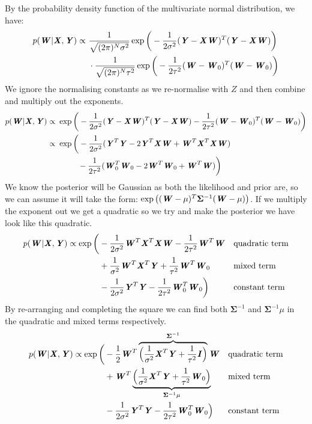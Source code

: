 \documentclass{article}
\newcommand{\mat}[1]{\textbf{\textit{#1}}}
\begin{document}
By the probability density function of the multivariate normal distribution, we have:
\begin{align*}
	p(\mat{W}|\mat{X},\mat{Y}) \propto\ &\frac{1}{\sqrt{(2\pi)^N\sigma^2}}\exp\bigg(-\frac{1}{2\sigma^2}(\mat{Y}-\mat{X}\mat{W})^T(\mat{Y}-\mat{X}\mat{W})\bigg) \\
	&\cdot \frac{1}{\sqrt{(2\pi)^N\tau^2}}\exp\bigg(-\frac{1}{2\tau^2}(\mat{W}-\mat{W}_0)^T(\mat{W}-\mat{W}_0)\bigg) \\
\end{align*}
We ignore the normalising constants as we re-normalise with $Z$ and then combine and multiply out the exponents.
\begin{align*}
	p(\mat{W}|\mat{X},\mat{Y}) \propto\ &\exp\bigg(-\frac{1}{2\sigma^2}(\mat{Y}-\mat{X}\mat{W})^T(\mat{Y}-\mat{X}\mat{W})-\frac{1}{2\tau^2}(\mat{W}-\mat{W}_0)^T(\mat{W}-\mat{W}_0)\bigg) \\
	\propto\ &\exp\bigg(-\frac{1}{2\sigma^2}(\mat{Y}^T\mat{Y}-2\mat{Y}^T\mat{X}\mat{W}+\mat{W}^T\mat{X}^T\mat{X}\mat{W}) \\
	&\hspace{2.5em}-\frac{1}{2\tau^2}(\mat{W}_0^T\mat{W}_0-2\mat{W}^T\mat{W}_0+\mat{W}^T\mat{W})\bigg)
\end{align*}
We know the posterior will be Gaussian as both the likelihood and prior are, so we can assume it will take the form: $\exp\big((\mat{W}-\mu)^T\mathbf{\Sigma}^{-1}(\mat{W}-\mu)\big)$. If we multiply the exponent out we get a quadratic so we try and make the posterior we have look like this quadratic.
\begin{align*}
	p(\mat{W}|\mat{X},\mat{Y}) \propto \exp\bigg(&-\frac{1}{2\sigma^2}\mat{W}^T\mat{X}^T\mat{X}\mat{W}-\frac{1}{2\tau^2}\mat{W}^T\mat{W}	&&\mbox{quadratic term}\\
	&+\frac{1}{\sigma^2}\mat{W}^T\mat{X}^T\mat{Y}+\frac{1}{\tau^2}\mat{W}^T\mat{W}_0							&&\mbox{mixed term}\\
	&-\frac{1}{2\sigma^2}\mat{Y}^T\mat{Y}-\frac{1}{2\tau^2}\mat{W}_0^T\mat{W}_0\bigg)							&&\mbox{constant term}\\
\end{align*}
By re-arranging and completing the square we can find both $\mathbf{\Sigma}^{-1}$ and $\mathbf{\Sigma}^{-1}\mu$ in the quadratic and mixed terms respectively.
\begin{align*}
	p(\mat{W}|\mat{X},\mat{Y}) \propto \exp\bigg(&-\frac{1}{2}\mat{W}^T\overbrace{\Big(\frac{1}{\sigma^2}\mat{X}^T\mat{Y}+\frac{1}{\tau^2}\mat{I}\Big)}^{\mathbf{\Sigma}^{-1}}\mat{W}	&&\mbox{quadratic term}\\
	&+\mat{W}^T\underbrace{\Big(\frac{1}{\sigma^2}\mat{X}^T\mat{Y}+\frac{1}{\tau^2}\mat{W}_0\Big)}_{\mathbf{\Sigma}^{-1}\mu}						&&\mbox{mixed term}\\
	&-\frac{1}{2\sigma^2}\mat{Y}^T\mat{Y}-\frac{1}{2\tau^2}\mat{W}_0^T\mat{W}_0\Big)								&&\mbox{constant term}\\
\end{align*}
\end{document}

